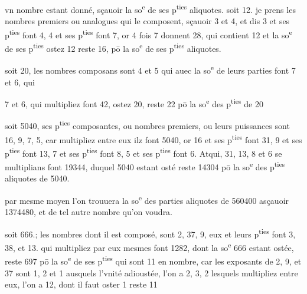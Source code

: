 \documentclass[11pt,a4paper]{article}
\begin{document}
vn nombre estant donné, sçauoir la so\textsuperscript{e} de ses p\textsuperscript{ties} aliquotes. soit 12. je prens les nombres premiers ou analogues qui le composent, sçauoir 3 et 4, et dis 3 et ses p\textsuperscript{ties} font 4, 4 et ses p\textsuperscript{ties} font 7, or 4 fois 7 donnent 28, qui contient 12 et la so\textsuperscript{e} de ses p\textsuperscript{ties} ostez 12 reste 16, pō la so\textsuperscript{e} de ses p\textsuperscript{ties} aliquotes.

soit 20, les nombres composans sont 4 et 5 qui auec la so\textsuperscript{e} de leurs parties font 7 et 6, qui


7 et 6, qui multipliez font 42, ostez 20, reste 22 pō la so\textsuperscript{e} des p\textsuperscript{ties} de 20

soit 5040, ses p\textsuperscript{ties} composantes, ou nombres premiers, ou leurs puissances sont 16, 9, 7, 5, car multipliez entre eux ilz font 5040, or 16 et ses p\textsuperscript{ties} font 31, 9 et ses p\textsuperscript{ties} font 13, 7 et ses p\textsuperscript{ties} font 8, 5 et ses p\textsuperscript{ties} font 6. Atqui, 31, 13, 8 et 6 se multiplians font 19344, duquel 5040 estant osté reste 14304 pō la so\textsuperscript{e} des p\textsuperscript{ties} aliquotes de 5040.

par mesme moyen l'on trouuera la so\textsuperscript{e} des parties aliquotes de 560400 asçauoir 1374480, et de tel autre nombre qu'on voudra.

soit 666.; les nombres dont il est composé, sont 2, 37, 9, eux et leurs p\textsuperscript{ties} font 3, 38, et 13. qui multipliez par eux mesmes font 1282, dont la so\textsuperscript{e} 666 estant ostée, reste 697 pō la so\textsuperscript{e} de ses p\textsuperscript{ties} qui sont 11 en nombre, car les exposants de 2, 9, et 37 sont 1, 2 et 1 ausquels l'vnité adioustée, l'on a 2, 3, 2 lesquels multipliez entre eux, l'on a 12, dont il faut oster 1 reste 11
\end{document}
